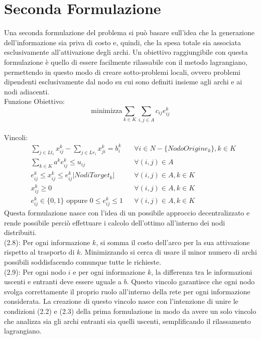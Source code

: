 \documentclass[12pt,a4paper,twoside]{report}
\begin{document}
	\section{Seconda Formulazione}
	Una seconda formulazione del problema si può basare sull'idea che la generazione dell'informazione sia priva di costo e, quindi, che la spesa totale sia associata esclusivamente all'attivazione degli archi. Un obiettivo raggiungibile con questa formulazione è quello di essere facilmente rilassabile con il metodo lagrangiano, permettendo in questo modo di creare sotto-problemi locali, ovvero problemi dipendenti esclusivamente dal nodo su cui sono definiti insieme agli archi e ai nodi adiacenti. \smallskip \\
	Funzione Obiettivo:\\
	\begin{equation}
		\text{minimizza} \sum_{k \in K} \sum_{i,j \in A} c_{ij}e^k_{ij} 
	\end{equation}
	\smallskip \\
	Vincoli:\\
	\begin{align}
		& \sum_{j \in Lt_i}x^k_{ij}-\sum_{j \in Lr_i} x^k_{ji}=b^k_i && \forall i \in N-\{NodoOrigine_k\}, k \in K\\[3ex]
		& \sum_{k \in K}a^ke^k_{ij}\leq u_{ij} && \forall (i,j) \in A\\[3ex]
		& e^k_{ij}\leq x^k_{ij} \leq e^k_{ij}|NodiTarget_k| && \forall(i,j) \in A, k \in K\\[3ex]
		& x^k_{ij}\geq 0 && \forall (i,j) \in A, k \in K\\[3ex]
		& e^k_{ij} \in \{0,1\} \text{ oppure } 0 \leq e^k_{ij}\leq 1 && \forall (i,j) \in A, k \in K
	\end{align}
	Questa formulazione nasce con l'idea di un possibile approccio decentralizzato e rende possibile perciò effettuare i calcolo dell'ottimo all'interno dei nodi distribuiti.\smallskip \\
	(2.8): Per ogni informazione $k$, si somma il costo dell'arco per la sua attivazione rispetto al trasporto di $k$. Minimizzando si cerca di usare il minor numero di archi possibili soddisfacendo comunque tutte le richieste.\\
	(2.9): Per ogni nodo $i$ e per ogni informazione $k$, la differenza tra le informazioni uscenti e entranti deve essere uguale a $b$. Questo vincolo garantisce che ogni nodo svolga correttamente il proprio ruolo all'interno della rete per ogni informazione considerata.
	La creazione di questo vincolo nasce con l'intenzione di unire le condizioni (2.2) e (2.3) della prima formulazione in modo da avere un solo vincolo che analizza sia gli archi entranti sia quelli uscenti, semplificando il rilassamento lagrangiano.\\
\end{document}
